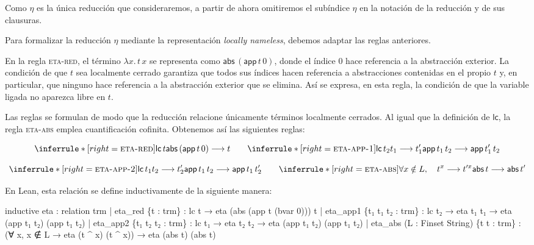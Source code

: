 \documentclass[
  spanish,
  letterpaper,
  DIV=11,
  numbers=noendperiod]{scrreprt}
\newenvironment{Shaded}{\begin{snugshade}}{\end{snugshade}}
\newcommand{\NormalTok}[1]{\textcolor[rgb]{0.00,0.23,0.31}{#1}}
\renewcommand{\NormalTok}[1]{\textcolor[HTML]{000000}{#1}}
\theoremstyle{remark}
\begin{document}
Como \(\eta\) es la única reducción que consideraremos, a partir de
ahora omitiremos el subíndice \(\eta\) en la notación de la reducción y
de sus clausuras.

Para formalizar la reducción \(\eta\) mediante la representación
\emph{locally nameless}, debemos adaptar las reglas anteriores.

En la regla \textsc{eta-red}, el término \(\lambda x.\,t\,x\) se
representa como \(\mathsf{abs}\,(\mathsf{app}\,t\,0)\), donde el índice
\(0\) hace referencia a la abstracción exterior. La condición de que
\(t\) sea localmente cerrado garantiza que todos sus índices hacen
referencia a abstracciones contenidas en el propio \(t\) y, en
particular, que ninguno hace referencia a la abstracción exterior que se
elimina. Así se expresa, en esta regla, la condición de que la variable
ligada no aparezca libre en \(t\).

Las reglas se formulan de modo que la reducción relacione únicamente
términos localmente cerrados. Al igual que la definición de
\(\mathsf{lc}\), la regla \textsc{eta-abs} emplea cuantificación
cofinita. Obtenemos así las siguientes reglas:

\[
\inferrule*[right=\textsc{eta-red}]
  {\mathsf{lc} \, t}
  {\mathsf{abs} \, (\mathsf{app} \, t \, 0)
   \longrightarrow t}
\qquad
\inferrule*[right=\textsc{eta-app-1}]
  {\mathsf{lc} \, t_2 \\ 
    t_1 \longrightarrow t_1'}
  {\mathsf{app}\,t_1\,t_2
   \longrightarrow
   \mathsf{app}\,t_1'\,t_2}
\]

\[
\inferrule*[right=\textsc{eta-app-2}]
  {\mathsf{lc} \, t_1 \\
   t_2 \longrightarrow t_2'}
  {\mathsf{app}\,t_1\,t_2
   \longrightarrow
   \mathsf{app} \, t_1 \, t_2'}
\qquad
\inferrule*[right=\textsc{eta-abs}]
  {\forall x\notin L, \quad
   t^x \longrightarrow t'^x}
  {\mathsf{abs}\,t
   \longrightarrow
   \mathsf{abs}\,t'}
\]

En Lean, esta relación se define inductivamente de la siguiente manera:

\begin{Shaded}
\begin{Highlighting}[]
\NormalTok{inductive eta : relation trm}
\NormalTok{  | eta\_red \{t : trm\} :}
\NormalTok{      lc t →}
\NormalTok{      eta (abs (app t (bvar 0))) t}
\NormalTok{  | eta\_app1 \{t₁ t₁\textquotesingle{} t₂ : trm\} :}
\NormalTok{      lc t₂ →}
\NormalTok{      eta t₁ t₁\textquotesingle{} →}
\NormalTok{      eta (app t₁ t₂) (app t₁\textquotesingle{} t₂)}
\NormalTok{  | eta\_app2 \{t₁ t₂ t₂\textquotesingle{} : trm\} :}
\NormalTok{      lc t₁ →}
\NormalTok{      eta t₂ t₂\textquotesingle{} →}
\NormalTok{      eta (app t₁ t₂) (app t₁ t₂\textquotesingle{})}
\NormalTok{  | eta\_abs (L : Finset String) \{t t\textquotesingle{} : trm\} :}
\NormalTok{      (∀ x, x ∉ L → eta (t \^{} x) (t\textquotesingle{} \^{} x)) →}
\NormalTok{      eta (abs t) (abs t\textquotesingle{})}
\end{Highlighting}
\end{Shaded}
\end{document}
